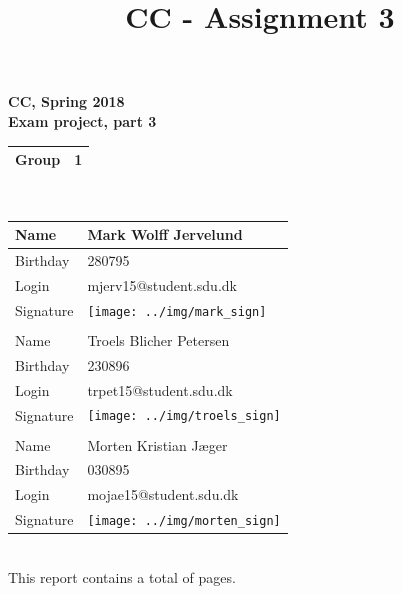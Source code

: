 \documentclass[a4paper,10pt,titlepage]{report}
\date{}
\title{CC - Assignment 3}
\begin{document}
\newpage
{%
\centering
    \huge
    \bfseries
    \vspace{5mm}
CC, Spring 2018\\
Exam project, part 3\\
\vspace{5mm}
\begin{tabular}{|l|l|}
\hline
Group & 1 \\ \hline
\end{tabular}
\\
\vspace{10mm}
\begin{tabular}{@{}ll@{}}
\toprule
\multicolumn{1}{|l|}{Name}      & \multicolumn{1}{l|}{Mark Wolff Jervelund } \\ \midrule
\multicolumn{1}{|l|}{Birthday}  & \multicolumn{1}{l|}{280795} \\ \midrule
\multicolumn{1}{|l|}{Login}     & \multicolumn{1}{l|}{mjerv15@student.sdu.dk} \\ \midrule
\multicolumn{1}{|l|}{Signature} & \multicolumn{1}{l|}{\texttt{[image: ../img/mark\_sign]}} \\ \midrule
                                &                       \\ \midrule
\multicolumn{1}{|l|}{Name}      &  \multicolumn{1}{l|}{Troels Blicher Petersen} \\ \midrule
\multicolumn{1}{|l|}{Birthday}      &   \multicolumn{1}{l|}{230896} \\ \midrule
\multicolumn{1}{|l|}{Login}      &  \multicolumn{1}{l|}{trpet15@student.sdu.dk} \\ \midrule
\multicolumn{1}{|l|}{Signature}      & \multicolumn{1}{l|}{\texttt{[image: ../img/troels\_sign]} } \\ \midrule
                                &                       \\ \midrule
\multicolumn{1}{|l|}{Name}     &  \multicolumn{1}{l|}{Morten Kristian Jæger} \\ \midrule
\multicolumn{1}{|l|}{Birthday}      &  \multicolumn{1}{l|}{030895} \\ \midrule
\multicolumn{1}{|l|}{Login}     &   \multicolumn{1}{l|}{mojae15@student.sdu.dk} \\ \midrule
\multicolumn{1}{|l|}{Signature}    &  \multicolumn{1}{l|}{\texttt{[image: ../img/morten\_sign]}} \\ \midrule
\end{tabular}
\\
\vspace{10mm}
This report contains a total of \underline{ \pageref{LastPage} } pages.
}
\end{document}
